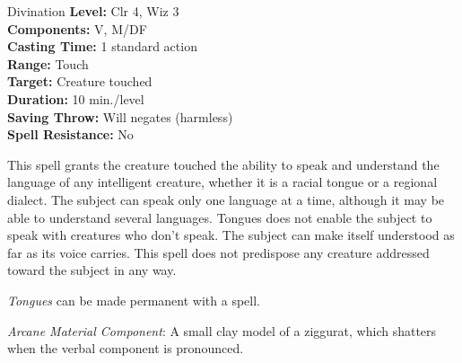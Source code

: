{Divination}
{
	\textbf{Level:}
	Clr 4, Wiz 3\\
	\textbf{Components:}
	V, M/DF\\
	\textbf{Casting Time:}
	1 standard action\\
	\textbf{Range:}
	Touch\\
	\textbf{Target:}
	Creature touched\\
	\textbf{Duration:}
	10 min./level\\
	\textbf{Saving Throw:}
	Will negates (harmless)\\
	\textbf{Spell Resistance:}
	No\\
}
{
	This spell grants the creature touched the ability to speak and understand the language of any intelligent creature, whether it is a racial tongue or a regional dialect. The subject can speak only one language at a time, although it may be able to understand several languages. Tongues does not enable the subject to speak with creatures who don't speak. The subject can make itself understood as far as its voice carries. This spell does not predispose any creature addressed toward the subject in any way.

	\emph{Tongues} can be made permanent with a  spell.

	\textit{Arcane Material Component}:
	A small clay model of a ziggurat, which shatters when the verbal component is pronounced.

}
